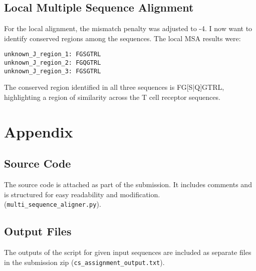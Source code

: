 \documentclass{article}
\begin{document}
\subsection{Local Multiple Sequence Alignment}
For the local alignment, the mismatch penalty was adjusted to -4. I now want to identify conserved regions among the sequences. The local MSA results were:
\begin{verbatim}
unknown_J_region_1: FGSGTRL
unknown_J_region_2: FGQGTRL
unknown_J_region_3: FGSGTRL
\end{verbatim}
The conserved region identified in all three sequences is FG[S|Q]GTRL, highlighting a region of similarity across the T cell receptor sequences.

\section{Appendix}
\subsection{Source Code}
The source code is attached as part of the submission. It includes comments and is structured for easy readability and modification. (\texttt{multi\_sequence\_aligner.py}).


\subsection{Output Files}
The outputs of the script for given input sequences are included as separate files in the submission zip (\texttt{cs\_assignment\_output.txt}).
\end{document}
